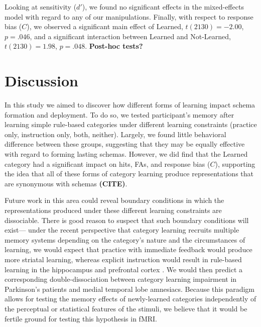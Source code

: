 \documentclass[twocolumn]{svjour3}          %
\begin{document}
Looking at sensitivity ($d'$), we found no significant effects in the
mixed-effects model with regard to any of our manipulations. Finally,
with respect to response bias ($C$), we observed a significant main
effect of Learned, $t(2130) = -2.00$, $p = .046$, and a significant
interaction between Learned and Not-Learned, $t(2130) = 1.98$, $p =
.048$. \textbf{Post-hoc tests?}

\section*{Discussion}
\label{discussion}
In this study we aimed to discover how different forms of learning
impact schema formation and deployment. To do so, we tested
participant's memory after learning simple rule-based categories under
different learning constraints (practice only, instruction only, both,
neither). Largely, we found little behavioral difference between these
groups, suggesting that they may be equally effective with regard to
forming lasting schemas. However, we did find that the Learned
category had a significant impact on hits, FAs, and response bias
($C$), supporting the idea that all of these forms of category
learning produce representations that are synonymous with schemas
\textbf{(CITE)}.

Future work in this area could reveal boundary conditions in which the
representations produced under these different learning constraints
are dissociable. There is good reason to suspect that such boundary
conditions will exist--- under the recent perspective that category
learning recruits multiple memory systems depending on the category's
nature and the circumstances of learning, we would expect that
practice with immediate feedback would produce more striatal learning,
whereas explicit instruction would result in rule-based learning in
the hippocampus and prefrontal cortex \cite{Ashby2011}. We would then
predict a corresponding double-dissociation between category learning
impairment in Parkinson's patients and medial temporal lobe
amnesiacs. Because this paradigm allows for testing the memory effects
of newly-learned categories independently of the perceptual or
statistical features of the stimuli, we believe that it would be
fertile ground for testing this hypothesis in fMRI.

\begin{acknowledgements}
\end{acknowledgements}

 
\end{document}
